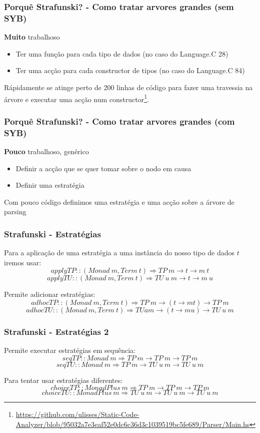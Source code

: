 \documentclass{beamer}
\begin{document}
\begin{frame} \frametitle{Porquê Strafunski? - Como tratar arvores grandes (sem SYB)}
\begin{alertblock}{\textbf{Muito} trabalhoso}
\begin{itemize}
\item Ter uma função para cada tipo de dados (no caso do Language.C 28)
\item Ter uma acção para cada constructor de tipos (no caso do Language.C 84)
\end{itemize}
\end{alertblock}
Rápidamente se atinge perto de 200 linhas de código para fazer uma travessia na árvore e executar uma acção num constructor\footnote{\url{https://github.com/ulisses/Static-Code-Analyzer/blob/95032a7e3eaf52e0dc6c36d3c1039519bc5fe689/Parser/Main.hs}}.
\end{frame}

\begin{frame} \frametitle{Porquê Strafunski? - Como tratar arvores grandes (com SYB)}
\begin{exampleblock}{\textbf{Pouco} trabalhoso, genérico}
\begin{itemize}
\item Definir a acção que se quer tomar sobre o nodo em causa
\item Definir uma estratégia
\end{itemize}
\end{exampleblock}
Com pouco código definimos uma estratégia e uma acção sobre a árvore de parsing
\end{frame}

\begin{frame} \frametitle{Strafunski - Estratégias}
Para a aplicação de uma estratégia a uma instância do nosso tipo de dados $t$ iremos usar:
$$applyTP :: (Monad~m, Term~t) \Rightarrow TP~m \rightarrow t \rightarrow m~t$$
$$applyTU :: (Monad~m, Term~t) \Rightarrow TU~u~m \rightarrow t \rightarrow m~u$$

Permite adicionar estratégias:
$$adhocTP :: (Monad~m, Term~t) \Rightarrow TP~m \rightarrow (t \rightarrow m t) \rightarrow TP~m$$
$$adhocTU :: (Monad~m, Term~t) \Rightarrow TU a m \rightarrow (t \rightarrow m u) \rightarrow TU~u~m$$
\end{frame}

\begin{frame} \frametitle{Strafunski - Estratégias 2}
Permite executar estratégias em sequência:
$$seqTP :: Monad~m \Rightarrow TP~m \rightarrow TP~m \rightarrow TP~m$$
$$seqTU :: Monad~m \Rightarrow TP~m \rightarrow TU~u~m \rightarrow TU~u~m$$

Para tentar usar estratégias diferentes:
$$choiceTP :: MonadPlus~m \Rightarrow TP~m \rightarrow TP~m \rightarrow TP~m$$
$$choiceTU :: MonadPlus~m \Rightarrow TU~u~m \rightarrow TU~u~m \rightarrow TU~u~m$$
\end{frame}
\end{document}
